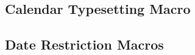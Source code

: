 \subsection{Calendar Typesetting Macro}

\begin{command}{\pgfcalendar{}}
  
\end{command}



\begin{command}{\pgfcalendarsuggestedname}
  
\end{command}

\subsection{Date Restriction Macros}


\begin{command}{\pgfcalendaron{}}
  
\end{command}


